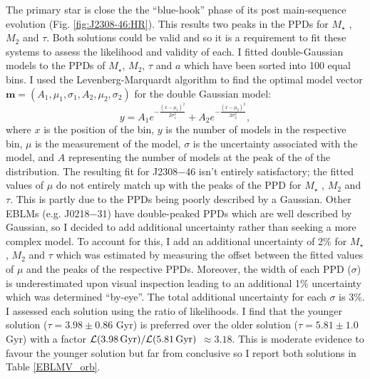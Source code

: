 The primary star is close the the ``blue-hook'' phase of its post main-sequence evolution (Fig. \ref{fig:J2308-46:HR}). This results two peaks in the PPDs for $M_\star$ , $M_2$ and $\tau$. Both solutions could be valid and so it is a requirement to fit these systems to assess the likelihood and validity of each. 
I fitted double-Gaussian models to the PPDs of $M_\star$, $M_2$, $\tau$ and $a$ which have been sorted into 100 equal bins. I used the Levenberg-Marquardt algorithm to find the optimal model vector $\textbf{m} = (A_1, \mu_1, \sigma_1, A_2, \mu_2, \sigma_2)$ for the double Gaussian model:
%
\begin{equation}
    y = A_1e^{-\frac{(x-\mu_1)^2}{2\sigma_1^2}} + A_2e^{-\frac{(x-\mu_2)^2}{2\sigma_2^2}},
\end{equation}
%
where $x$ is the position of the bin, $y$ is the number of models in the respective bin, $\mu$ is the measurement of the model, $\sigma$ is the uncertainty associated with the model, and $A$ representing the number of models at the peak of the of the distribution. 
The resulting fit for J2308$-$46 isn't entirely satisfactory; the fitted values of $\mu$ do not entirely match up with the peaks of the PPD for $M_\star$ , $M_2$ and $\tau$. This is partly due to the PPDs being poorly described by a Gaussian. Other EBLMs (e.g. J0218$-$31) have double-peaked PPDs which are well described by Gaussian, so I decided to add additional uncertainty rather than seeking a more complex model. To account for this, I add an additional uncertainty of 2\% for $M_\star$ , $M_2$ and $\tau$ which was estimated by measuring the offset between the fitted values of $\mu$ and the peaks of the respective PPDs. Moreover, the width of each PPD ($\sigma$) is underestimated upon visual inspection leading to an additional 1\% uncertainty which was determined ``by-eye''. The total additional uncertainty for each $\sigma$ is 3\%. I assessed each solution using the ratio of likelihoods. I find that the younger solution ($\tau = 3.98 \pm 0.86$ Gyr) is preferred over the older solution ($\tau = 5.81 \pm 1.0$ Gyr) with a factor $\mathcal{L}(3.98\, \rm Gyr) / \mathcal{L}(5.81\, \rm Gyr)$ $\approx 3.18$. This is moderate evidence to favour the younger solution but far from conclusive so I report both solutions in Table \ref{EBLMV_orb}. %





